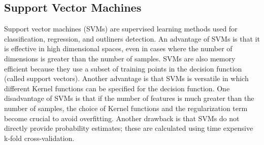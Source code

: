 \documentclass[11pt]{article}
\begin{document}
	\subsection{Support Vector Machines}
	Support vector machines (SVMs) are supervised learning methods used for classification, regression, and outliners detection.
	\medbreak
	An advantage of SVMs is that it is effective in high dimensional spaces, even in cases where the number of dimensions is greater than the number of samples. SVMs are also memory efficient because they use a subset of training points in the decision function (called support vectors). Another advantage is that SVMs is versatile in which different Kernel functions can be specified for the decision function.
	One disadvantage of SVMs is that if the number of features is much greater than the number of samples, the choice of Kernel functions and the regularization term become crucial to avoid overfitting. Another drawback is that SVMs do not directly provide probability estimates; these are calculated using time expensive k-fold cross-validation.
	\medbreak
%	
\end{document}
